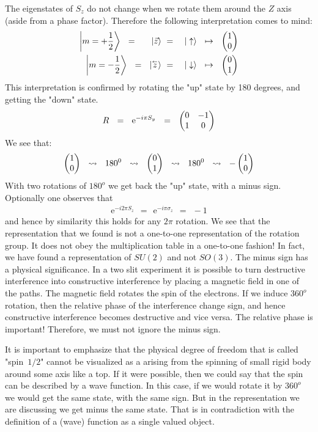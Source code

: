 \documentclass[onecolumn,fleqn]{revtex4}
\newcommand{\vecb}[1]{\overset{{}_{\leftarrow}}{#1}}
\newcommand{\eexp}{\mathrm{e}^}
\newcommand{\amatrix}[1]{\begin{matrix} #1 \end{matrix}}
\newcommand{\beq}{\begin{eqnarray}}
\newcommand{\eeq}{\end{eqnarray}}
\begin{document}
The eigenstates of ${S_z}$ 
do not change when we rotate them around 
the $Z$ axis (aside from a phase factor). 
Therefore the following interpretation comes to mind: 
\beq
\left|m=+\frac{1}{2}\right\rangle
\ \ = \ \ 
\ \ \ |\vec{z} \rangle 
& \ = \ & 
| \uparrow \rangle  
\ \ \mapsto \ \ 
\left( \amatrix{1 \cr 0} \right)
\\ 
\left|m=-\frac{1}{2}\right\rangle 
\ \ = \ \ 
| \vecb{z} \rangle 
& \ = \ & 
| \downarrow \rangle 
\ \ \mapsto \ \  
\left( \amatrix{0 \cr 1} \right)
\eeq
This interpretation is confirmed by rotating 
the "up" state by 180 degrees, and getting the "down" state. 
\beq
R \ \ = \ \ \eexp{-i{\pi}S_y} \ \  = \ \ \left(\amatrix{0 & -1 \cr 1 & 0 } \right) 
\eeq
We see that:
\beq
\left( \amatrix{ 1 \cr 0} \right) 
\ \ \leadsto  \ \ 180^{0} 
\ \ \leadsto  \ \  { \left(\amatrix{0\cr 1}\right) } 
\ \ \leadsto  \ \  180^{0} 
\ \ \leadsto  \ \  - \left(\amatrix{1\cr 0}\right) 
\eeq
With two rotations of $180^o$  we get back the "up" state, with a minus sign.
Optionally one observes that 
\beq
\eexp{-i 2\pi S_z} \ \ = \ \ \eexp{-i{\pi}\sigma_z} \ \ = \ \ -1 
\eeq
and hence by similarity this holds for any $2\pi$ rotation.
We see that the representation that we found is not 
a one-to-one representation of the rotation group. 
It does not obey the multiplication table in 
a one-to-one fashion! In fact, we have found a representation 
of $SU(2)$ and not $SO(3)$. The minus sign has a physical significance. 
In a two slit experiment it is possible to turn destructive 
interference into constructive interference by placing 
a magnetic field in one of the paths. The magnetic field 
rotates the spin of the electrons. 
If we induce $360^o$ rotation, then the relative 
phase of the interference change sign, 
and hence constructive interference becomes 
destructive and vice versa. The relative phase is important! 
Therefore, we must not ignore the minus sign. 



It is important to emphasize that the physical degree of freedom 
that is called "spin~$1/2$" cannot be visualized  
as a arising from the spinning of small rigid body 
around some axis like a top. 
If it were possible, then we could say that the spin 
can be described by a wave function. In this case, 
if we would rotate it by ${360^o}$ we would get 
the same state, with the same sign. But in the representation 
we are discussing we get minus the same state. 
That is in contradiction with the definition of a (wave) function 
as a single valued object. 
\end{document}
